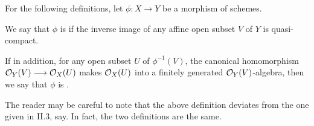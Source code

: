 For the following definitions, let $\phi: X \to Y$ be a morphism of 
schemes.

\begin{defn}
We say that $\phi$ is 
if the inverse image of any affine open subset $V$ of $Y$ is
quasi-compact. 

If in addition, for any open subset $U$ of $\phi^{-1}(V)$, the 
canonical homomorphism $\mathcal{O}_Y(V) \longrightarrow \mathcal{O}_X(U)$ makes $\mathcal{O}_X(U)$ into 
a finitely generated $\mathcal{O}_Y(V)$-algebra, then we say that $\phi$ is 
.
\end{defn}

The reader may be careful to note that the above definition
deviates from the one given in \cite{Hart} II.3, say. In fact,
the two definitions are the same.

